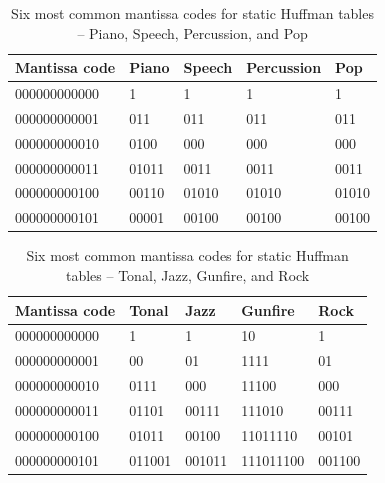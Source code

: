 \documentclass{vldb}
\begin{document}
\begin{table}[h]
  \centering
    \begin{tabular}{ | l | l | l | l | l |}
      \hline
      Mantissa code & Piano & Speech & Percussion & Pop \\
      \hline
      000000000000     & 1      & 1      & 1       & 1   \\
      000000000001     & 011      & 011      & 011     & 011  \\
      000000000010     & 0100      & 000     & 000      & 000 \\
      000000000011     & 01011      & 0011     & 0011    & 0011  \\
      000000000100     & 00110      & 01010     & 01010     & 01010  \\
      000000000101     & 00001      & 00100     & 00100     & 00100  \\
      \hline
    \end{tabular}
  \caption{Six most common mantissa codes for static Huffman tables -- Piano, Speech, Percussion, and Pop}
  \label{table:huffmancodes1}
\end{table}
\begin{table}[ht]
  \centering
    \begin{tabular}{ | l | l | l | l | l |}
      \hline
      Mantissa code & Tonal & Jazz & Gunfire & Rock \\
      \hline
      000000000000     & 1      & 1      & 10       & 1   \\
      000000000001     & 00      & 01      & 1111     & 01  \\
      000000000010     & 0111      & 000     & 11100      & 000 \\
      000000000011     & 01101      & 00111     & 111010     & 00111  \\
      000000000100     & 01011      & 00100     & 11011110     & 00101  \\
      000000000101     & 011001      & 001011     & 111011100     & 001100  \\
      \hline
    \end{tabular}
  \caption{Six most common mantissa codes for static Huffman tables -- Tonal, Jazz, Gunfire, and Rock}
  \label{table:huffmancodes2}
\end{table}
\end{document}
